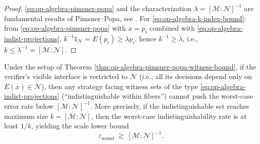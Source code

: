 \begin{proof}
\eqref{eq:op-algebra-pimsner-popa} and the characterization \(\lambda=[\mathcal{M}:\mathcal{N}]^{-1}\) are fundamental results of Pimsner--Popa, see \cite{PimsnerPopa1986EntropyIndexSubfactors}.
For \eqref{eq:op-algebra-k-index-bound}:
from \eqref{eq:op-algebra-pimsner-popa} with \(x=p_i\) combined with \eqref{eq:op-algebra-indist-projections},
\(
k^{-1}1_{\mathcal{N}}=E(p_i)\ge \lambda p_i
\),
hence \(k^{-1}\ge\lambda\), i.e., \(k\le \lambda^{-1}=[\mathcal{M}:\mathcal{N}]\). \qedhere
\end{proof}

\begin{corollary}\label{cor:op-algebra-soundness-lower-bound-index}
Under the setup of Theorem \ref{thm:op-algebra-pimsner-popa-witness-bound},
if the verifier's visible interface is restricted to \(\mathcal{N}\) (i.e., all its decisions depend only on \(E(x)\in\mathcal{N}\)),
then any strategy facing witness sets of the type \eqref{eq:op-algebra-indist-projections} (``indistinguishable within fibers'') cannot push the worst-case error rate below
\([\mathcal{M}:\mathcal{N}]^{-1}\).
More precisely, if the indistinguishable set reaches maximum size \(k=[\mathcal{M}:\mathcal{N}]\), then the worst-case indistinguishability rate is at least \(1/k\), yielding the scale lower bound
\[
\boxed{\;\varepsilon_{\mathrm{sound}}\ \gtrsim\ [\mathcal{M}:\mathcal{N}]^{-1}.\;}
\]
\end{corollary}

